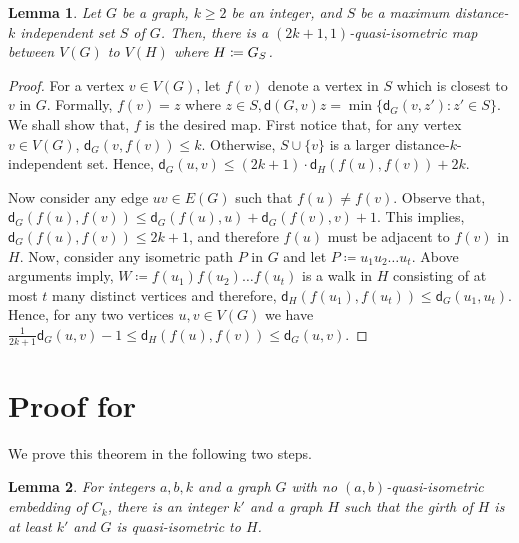 \documentclass[a4paper]{article}
\newcommand{\dist}[2]{\mathsf{d}\left(#1,#2\right)}
\newcommand{\distG}[3]{\mathsf{d}_{#1}\left(#2,#3\right)}
\newtheorem{lemma}{Lemma}
\begin{document}
\begin{lemma}
Let $G$ be a graph, $k\geq 2$ be an integer, and $S$ be a maximum distance-$k$ independent set $S$ of $G$. Then, there is a $(2k+1,1)$-quasi-isometric map between $V(G)$ to $V(H)$ where $H\coloneqq {G}_{S}$.
\end{lemma}
\begin{proof}
	For a vertex $v\in V(G)$, let $f(v)$ denote a vertex in $S$ which is closest to $v$ in $G$. Formally, $f(v)=z$ where $z\in S, \dist{G}{v}{z}=\min\{\distG{G}{v}{z'}\colon z'\in S\}$. We shall show that, $f$ is the desired map. First notice that, for any vertex $v\in V(G)$, $\distG{G}{v}{f(v)} \leq k$. Otherwise, $S\cup \{v\}$ is a larger distance-$k$-independent set. Hence, $\distG{G}{u}{v}\leq (2k+1)\cdot \distG{H}{f(u)}{f(v)} + 2k$. 
	
	Now consider any edge $uv\in E(G)$ such that $f(u)\not= f(v)$. Observe that, $\distG{G}{f(u)}{f(v)}\leq \distG{G}{f(u)}{u} + \distG{G}{f(v)}{v} + 1$. This implies, $\distG{G}{f(u)}{f(v)}\leq 2k+1$, and therefore $f(u)$ must be adjacent to $f(v)$ in $H$. 
	Now, consider any isometric path $P$ in $G$  and let $P\coloneqq u_1u_2\ldots u_t$. Above arguments imply, $W\coloneqq f(u_1)f(u_2)\ldots f(u_t)$ is a walk in $H$ consisting of at most $t$ many distinct vertices and therefore, $\distG{H}{f(u_1)}{f(u_t)}\leq \distG{G}{u_1}{u_t}$. Hence, for any two vertices $u,v\in V(G)$ we have $\frac{1}{2k+1}\distG{G}{u}{v}-1 \leq \distG{H}{f(u)}{f(v)} \leq \distG{G}{u}{v}$.
\end{proof}


\section{Proof for }

We prove this theorem in the following two steps. 

\begin{lemma}
For integers $a,b,k$ and a graph $G$ with no $(a,b)$-quasi-isometric embedding of $C_k$,  there is an integer $k'$ and a graph $H$ such that the girth of $H$ is at least $k'$ and $G$ is quasi-isometric to $H$.
\end{lemma}
\end{document}
